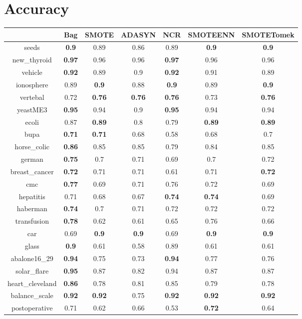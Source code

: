 \documentclass{article}%
\begin{document}
%
\normalsize%
\section*{Accuracy}%
\begin{tabular}{c|cccccc}%
&Bag&SMOTE&ADASYN&NCR&SMOTEENN&SMOTETomek\\%
\hline%
seeds&\textbf{0.9}&0.89&0.86&0.89&\textbf{0.9}&\textbf{0.9}\\%
new\_thyroid&\textbf{0.97}&0.96&0.96&\textbf{0.97}&0.96&0.96\\%
vehicle&\textbf{0.92}&0.89&0.9&\textbf{0.92}&0.91&0.89\\%
ionosphere&0.89&\textbf{0.9}&0.88&\textbf{0.9}&0.89&\textbf{0.9}\\%
vertebal&0.72&\textbf{0.76}&\textbf{0.76}&\textbf{0.76}&0.73&\textbf{0.76}\\%
yeastME3&\textbf{0.95}&0.94&0.9&\textbf{0.95}&0.94&0.94\\%
ecoli&0.87&\textbf{0.89}&0.8&0.79&\textbf{0.89}&\textbf{0.89}\\%
bupa&\textbf{0.71}&\textbf{0.71}&0.68&0.58&0.68&0.7\\%
horse\_colic&\textbf{0.86}&0.85&0.85&0.79&0.84&0.85\\%
german&\textbf{0.75}&0.7&0.71&0.69&0.7&0.72\\%
breast\_cancer&\textbf{0.72}&0.71&0.71&0.61&0.71&\textbf{0.72}\\%
cmc&\textbf{0.77}&0.69&0.71&0.76&0.72&0.69\\%
hepatitis&0.71&0.68&0.67&\textbf{0.74}&\textbf{0.74}&0.69\\%
haberman&\textbf{0.74}&0.7&0.71&0.72&0.72&0.72\\%
transfusion&\textbf{0.78}&0.62&0.61&0.65&0.76&0.66\\%
car&0.69&\textbf{0.9}&\textbf{0.9}&0.69&\textbf{0.9}&\textbf{0.9}\\%
glass&\textbf{0.9}&0.61&0.58&0.89&0.61&0.61\\%
abalone16\_29&\textbf{0.94}&0.75&0.73&\textbf{0.94}&0.77&0.76\\%
solar\_flare&\textbf{0.95}&0.87&0.82&0.94&0.87&0.87\\%
heart\_cleveland&\textbf{0.86}&0.78&0.81&0.85&0.79&0.78\\%
balance\_scale&\textbf{0.92}&\textbf{0.92}&0.75&\textbf{0.92}&\textbf{0.92}&\textbf{0.92}\\%
postoperative&0.71&0.62&0.66&0.53&\textbf{0.72}&0.64\\%
\end{tabular}
\end{document}
